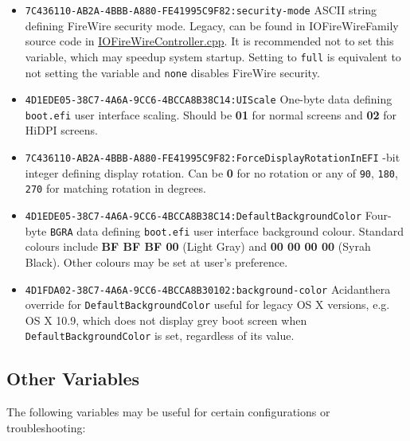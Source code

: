 \documentclass[]{article}
\makeatletter
\renewcommand{\label}[1]{%
\zref@wrapper@immediate{\oldlabel{#1}}}  %
\makeatother
\begin{document}
\begin{itemize}
  will not enable ABC keyboard, unlike previous and subsequent macOS versions, and is thus not recommended in case 10.14 is needed.
\item
  \texttt{7C436110-AB2A-4BBB-A880-FE41995C9F82:security-mode}
  \break
  ASCII string defining FireWire security mode. Legacy, can be found in IOFireWireFamily
  source code in
  \href{https://github.com/apple-oss-distributions/IOFireWireFamily/blob/main/IOFireWireFamily.kmodproj/IOFireWireController.cpp}{IOFireWireController.cpp}.
  It is recommended not to set this variable, which may speedup system startup. Setting to
  \texttt{full} is equivalent to not setting the variable and \texttt{none} disables
  FireWire security.
\item
  \texttt{4D1EDE05-38C7-4A6A-9CC6-4BCCA8B38C14:UIScale}
  \break
  One-byte data defining \texttt{boot.efi} user interface scaling. Should be \textbf{01} for normal
  screens and \textbf{02} for HiDPI screens.
\item
  \texttt{7C436110-AB2A-4BBB-A880-FE41995C9F82:ForceDisplayRotationInEFI}
  -bit integer defining display rotation. Can be \textbf{0} for no rotation
  or any of \texttt{90}, \texttt{180}, \texttt{270} for matching rotation in degrees.
\item
  \texttt{4D1EDE05-38C7-4A6A-9CC6-4BCCA8B38C14:DefaultBackgroundColor}
  \break
  Four-byte \texttt{BGRA} data defining \texttt{boot.efi} user interface background colour.
  Standard colours include \textbf{BF BF BF 00} (Light Gray) and \textbf{00 00 00 00}
  (Syrah Black). Other colours may be set at user's preference.
\item
  \texttt{4D1FDA02-38C7-4A6A-9CC6-4BCCA8B30102:background-color}
  \break
  Acidanthera override for \texttt{DefaultBackgroundColor} useful for legacy OS X
  versions, e.g. OS X 10.9, which does not display grey boot screen when
  \texttt{DefaultBackgroundColor} is set, regardless of its value.
\end{itemize}

\subsection{Other Variables}\label{nvramvarsother}

The following variables may be useful for certain configurations or
troubleshooting:
\end{document}
